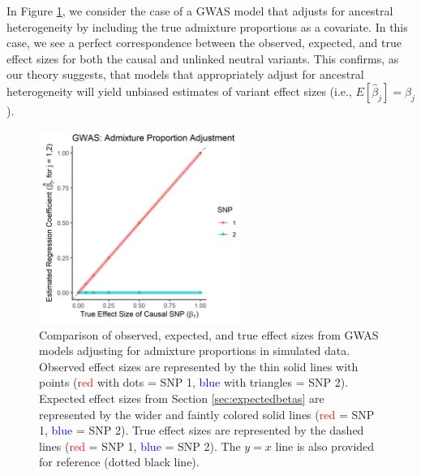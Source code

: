 \documentclass[12pt]{article}
\begin{document}
In Figure \ref{fig:pi}, we consider the case of a GWAS model that adjusts for ancestral heterogeneity by including the true admixture proportions as a covariate.
In this case, we see a perfect correspondence between the observed, expected, and true effect sizes for both the causal and unlinked neutral variants. 
This confirms, as our theory suggests, that models that appropriately adjust for ancestral heterogeneity will yield unbiased estimates of variant effect sizes (i.e., $E[\hat\beta_j] = \beta_j$).


\begin{figure}[!htb]
\centering
\includegraphics[width=0.6\textwidth]{figs/theorysims/sims_pi}
\caption[Observed versus expected and true effect sizes from admixture proportion adjusted GWAS models.]%
{Comparison of observed, expected, and true effect sizes from GWAS models adjusting for admixture proportions in simulated data. 
Observed effect sizes  are represented by the thin solid lines with points (\textcolor{red}{red} with dots = SNP 1, \textcolor{blue}{blue} with triangles = SNP 2). 
Expected effect sizes  from Section \ref{sec:expectedbetas} are represented by the wider and faintly colored solid lines (\textcolor{red}{red} = SNP 1, \textcolor{blue}{blue} = SNP 2).
True effect sizes are represented by the dashed lines (\textcolor{red}{red} = SNP 1, \textcolor{blue}{blue} = SNP 2).
The $y = x$ line is also provided for reference (dotted black line).}
\label{fig:pi}
\end{figure}
\end{document}
